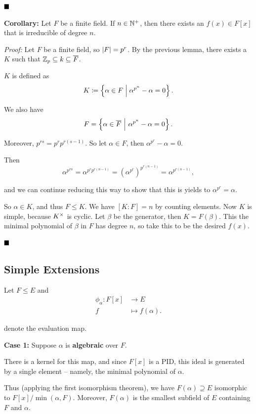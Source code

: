 \(\qed\)

\textbf{Corollary:} Let \(F\) be a finite field. If \(n\in{\mathbb{N}}^+\), then
there exists an \(f(x) \in F[x]\) that is irreducible of degree \(n\).

\emph{Proof:} Let \(F\) be a finite field, so \({\left\lvert {F} \right\rvert} = p^r\). By the
previous lemma, there exists a \(K\) such that
\({\mathbb{Z}}_p \subseteq k \subseteq \overline F\).

\(K\) is defined as \[
K \coloneqq \left\{{\alpha \in F \mathrel{\Big|} \alpha^{p^n} - \alpha = 0}\right\}
.\]

We also have \[
F  = \left\{{\alpha \in \overline F {~\mathrel{\Big|}~} \alpha^{p^n} - \alpha = 0}\right\}.\]

Moreover, \(p^{rs} = p^r p^{r(s-1)}\). So let \(\alpha \in F\), then
\(\alpha^{p^r} - \alpha = 0\).

Then \[
\alpha^{p^{rn}} = \alpha^{p^r p^{r(n-1)}} = (\alpha^{p^r})^{p^{r(n-1)}} = \alpha^{p^{r(n-1)}}
,\]

and we can continue reducing this way to show that this is yields to
\(\alpha^{p^r} = \alpha\).

So \(\alpha \in K\), and thus \(F \leq K\). We have \([K:F] = n\) by
counting elements. Now \(K\) is simple, because \(K^{\times}\) is cyclic.
Let \(\beta\) be the generator, then \(K = F(\beta)\). This the minimal
polynomial of \(\beta\) in \(F\) has degree \(n\), so take this to be
the desired \(f(x)\).

\(\qed\)

\hypertarget{simple-extensions}{%
\subsection{Simple Extensions}\label{simple-extensions}}

Let \(F \leq E\) and \begin{align*}
\phi_\alpha: F[x] &\to E \\
f &\mapsto f(\alpha)
.\end{align*}

denote the evaluation map.

\textbf{Case 1:} Suppose \(\alpha\) is \textbf{algebraic} over \(F\).

There is a kernel for this map, and since \(F[x]\) is a PID, this ideal
is generated by a single element -- namely, the minimal polynomial of
\(\alpha\).

Thus (applying the first isomorphism theorem), we have
\(F(\alpha) \supseteq E\) isomorphic to \(F[x] / \min(\alpha, F)\).
Moreover, \(F(\alpha)\) is the smallest subfield of \(E\) containing
\(F\) and \(\alpha\).

